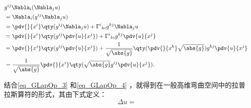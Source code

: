 \begin{equation}\label{eq_GLapOp_4}
\begin{aligned}
&g^{ij}\Nabla_i(\Nabla_j u)\\
&=\Nabla_i(g^{ij}\Nabla_j u)\\
&=\pdv{}{x^i}\qty(g^{ij}\Nabla_j u)+{\Gamma^{i}}_{ki}g^{kj}\Nabla_j u\\
&=\pdv{}{x^i}\qty(g^{ij}\pdv{u}{x^j})+{\Gamma^{i}}_{ki}g^{kj}\pdv{u}{x^j}\\
&=\pdv{}{x^i}\qty(g^{ij}\pdv{u}{x^j})+\frac{1}{\sqrt{\abs{g}}}\qty(\pdv{}{x^k}\sqrt{\abs{g}})g^{kj}\pdv{u}{x^j}\\
&=\frac{1}{\sqrt{\abs{g}}}\pdv{}{x^i}\qty(\sqrt{\abs{g}}g^{ij}\pdv{u}{x^j}).
\end{aligned}~
\end{equation}

结合\autoref{eq_GLapOp_3} 和\autoref{eq_GLapOp_4} ，就得到在一般高维弯曲空间中的拉普拉斯算符的形式，其由下式定义：
\begin{equation}
\Delta u=
\end{equation}






